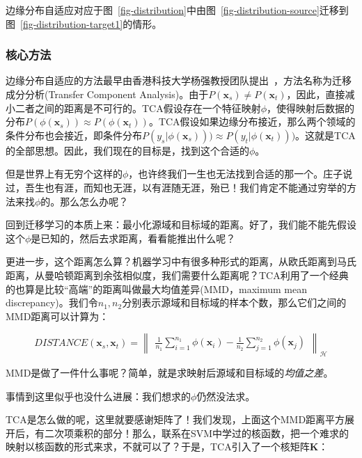 边缘分布自适应对应于图~\ref{fig-distribution}中由图~\ref{fig-distribution-source}迁移到图~\ref{fig-distribution-target1}的情形。

\subsubsection{核心方法}

边缘分布自适应的方法最早由香港科技大学杨强教授团队提出~\cite{pan2011domain}，方法名称为迁移成分分析(Transfer Component Analysis)。由于$P(\mathbf{x}_s) \ne P(\mathbf{x}_t)$，因此，直接减小二者之间的距离是不可行的。TCA假设存在一个特征映射$\phi$，使得映射后数据的分布$P(\phi(\mathbf{x}_s)) \approx P(\phi(\mathbf{x}_t))$。TCA假设如果边缘分布接近，那么两个领域的条件分布也会接近，即条件分布$P(y_s | \phi(\mathbf{x}_s))) \approx P(y_t | \phi(\mathbf{x}_t)))$。这就是TCA的全部思想。因此，我们现在的目标是，找到这个合适的$\phi$。

但是世界上有无穷个这样的$\phi$，也许终我们一生也无法找到合适的那一个。庄子说过，吾生也有涯，而知也无涯，以有涯随无涯，殆已！我们肯定不能通过穷举的方法来找$\phi$的。那么怎么办呢？

回到迁移学习的本质上来：最小化源域和目标域的距离。好了，我们能不能先假设这个$\phi$是已知的，然后去求距离，看看能推出什么呢？

更进一步，这个距离怎么算？机器学习中有很多种形式的距离，从欧氏距离到马氏距离，从曼哈顿距离到余弦相似度，我们需要什么距离呢？TCA利用了一个经典的也算是比较“高端”的距离叫做最大均值差异(MMD，maximum mean discrepancy)。我们令$n_1,n_2$分别表示源域和目标域的样本个数，那么它们之间的MMD距离可以计算为：

\begin{equation}
	\label{eq-distribution-mmd}
	DISTANCE(\mathbf{x}_{s},\mathbf{x}_{t})= \begin{Vmatrix} \frac{1}{n_1} \sum \limits_{i=1}^{n_1} \phi(\mathbf{x}_{i}) - \frac{1}{n_2}\sum \limits _{j=1}^{n_2} \phi(\mathbf{x}_{j}) \end{Vmatrix}_{\mathcal{H}}
\end{equation}

MMD是做了一件什么事呢？简单，就是求映射后源域和目标域的\textit{均值之差}。

事情到这里似乎也没什么进展：我们想求的$\phi$仍然没法求。

TCA是怎么做的呢，这里就要感谢矩阵了！我们发现，上面这个MMD距离平方展开后，有二次项乘积的部分！那么，联系在SVM中学过的核函数，把一个难求的映射以核函数的形式来求，不就可以了？于是，TCA引入了一个核矩阵$\mathbf{K}$：

